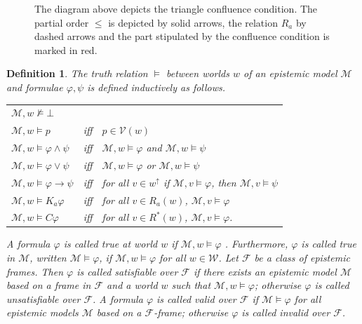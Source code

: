 \documentclass{myifcolog}
\newcommand\C {C}
\newcommand{\K}{K}
\newcommand{\agi}{a}
\newcommand{\fw}{\mathcal{M}}
\newcommand{\W}{\mathcal{W}}
\newcommand{\V}{\mathcal{V}}
\newcommand{\fclass}{\mathscr{F}}
\newtheorem{definition}[theorem]{Definition}
\numberwithin{theorem}{section}
\begin{document}
\begin{figure}[t]
    \centering
    \caption{The diagram above depicts the triangle confluence condition. The partial order $\leq$ is depicted by solid arrows, the relation $R_\agi$ by dashed arrows and the part stipulated by the confluence condition is marked in red.}
    \label{f: triangle confluence}
\end{figure}



\begin{definition}
    The \emph{truth relation} $\models$ between worlds $w$ of an epistemic model $\fw$ and formulae $\varphi, \psi$ is defined inductively as follows.
\begin{center}
    \begin{tabular}{l l l}
    $\fw, w \not \models \bot$ & & \\
    $\fw,w \models p$ & iff & $p \in \V(w)$ \\
    $\fw,w \models \varphi \wedge \psi$ & iff & $\fw,w \models \varphi$ and $\fw,w \models \psi$ \\
    $\fw,w \models \varphi \vee \psi$ & iff & $\fw,w \models \varphi$ or $\fw,w \models \psi$ \\
    $\fw,w \models \varphi \rightarrow \psi$ & iff & for all $v \in w^\uparrow$ if $\fw,v \models \varphi$, then $\fw,v \models \psi$ \\
    $\fw,w \models \K_\agi \varphi$ & iff & for all $v \in R_\agi(w)$, $\fw,v \models \varphi$ \\
    $\fw, w \models \C \varphi$ & iff & for all $v \in R^*(w)$, $\fw,v \models \varphi$.
    \end{tabular}
\end{center}
A formula $\varphi$ is called \emph{true at world $w$} if $\fw, w \models \varphi$ . Furthermore, $\varphi$ is called \emph{true in $\fw$}, written $\fw \models \varphi$, if $\fw, w \models \varphi$ for all $w \in \W$. Let $\fclass$ be a class of epistemic frames. Then $\varphi$ is called \emph{satisfiable} over $\fclass$ if there exists an epistemic model $\fw$ based on a frame in $\fclass$ and a world $w$ such that $\fw, w \models \varphi$; otherwise $\varphi$ is called \emph{unsatisfiable} over $\fclass$. A formula $\varphi$ is called \emph{valid} over $\fclass$ if $\fw \models \varphi$ for all epistemic models $\fw$ based on a $\fclass$-frame; otherwise $\varphi$ is called \emph{invalid} over $\fclass$.
\end{definition}
\end{document}
